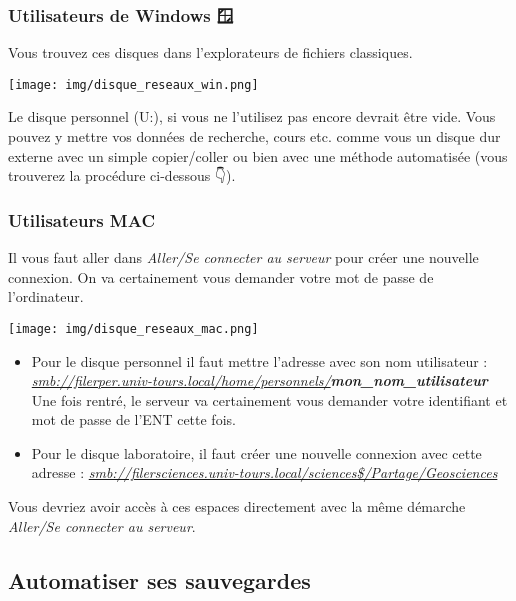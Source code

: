 \documentclass[
]{article}
\providecommand{\tightlist}{%
  \setlength{\itemsep}{0pt}\setlength{\parskip}{0pt}}
\begin{document}
\subsubsection{Utilisateurs de Windows
🪟}\label{utilisateurs-de-windows}

Vous trouvez ces disques dans l'explorateurs de fichiers classiques.

\texttt{[image: img/disque\_reseaux\_win.png]}

Le disque personnel (U:), si vous ne l'utilisez pas encore devrait être
vide. Vous pouvez y mettre vos données de recherche, cours etc. comme
vous un disque dur externe avec un simple copier/coller ou bien avec une
méthode automatisée (vous trouverez la procédure ci-dessous 👇).

\subsubsection{Utilisateurs MAC 🍎}\label{utilisateurs-mac}

Il vous faut aller dans \emph{Aller/Se connecter au serveur} pour créer
une nouvelle connexion. On va certainement vous demander votre mot de
passe de l'ordinateur.

\texttt{[image: img/disque\_reseaux\_mac.png]}

\begin{itemize}
\tightlist
\item
  Pour le disque personnel il faut mettre l'adresse avec son nom
  utilisateur :
  \href{smb://filerper.univ-tours.local/home/personnels/}{\emph{smb://filerper.univ-tours.local/home/personnels/}}\textbf{\emph{mon\_nom\_utilisateur}}
  Une fois rentré, le serveur va certainement vous demander votre
  identifiant et mot de passe de l'ENT cette fois.
\item
  Pour le disque laboratoire, il faut créer une nouvelle connexion avec
  cette adresse :
  \href{smb://filersciences.univ-tours.local/sciences$/Partage/Geosciences}{\emph{smb://filersciences.univ-tours.local/sciences\$/Partage/Geosciences}}
\end{itemize}

Vous devriez avoir accès à ces espaces directement avec la même démarche
\emph{Aller/Se connecter au serveur}.

\subsection{Automatiser ses sauvegardes
🤖}\label{automatiser-ses-sauvegardes}
\end{document}
